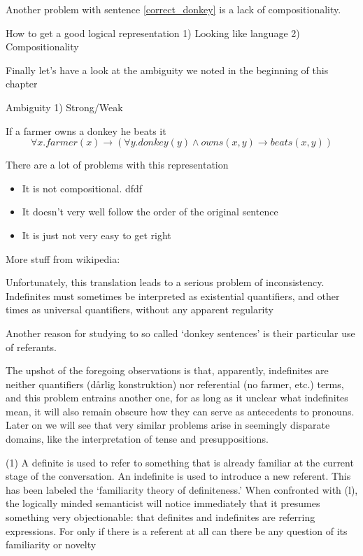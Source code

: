 \documentclass[12pt]{article}
\begin{document}
Another problem with sentence \eqref{correct_donkey} is a lack of compositionality.

How to get a good logical representation
  1) Looking like language
  2) Compositionality

Finally let's have a look at the ambiguity we noted in the beginning of this chapter

Ambiguity
  1) Strong/Weak






If a farmer owns a donkey he beats it
\begin{equation}
\forall x . farmer(x) \rightarrow (\forall y . donkey(y) \wedge owns(x,y) \rightarrow beats(x,y))
\end{equation}

There are a lot of problems with this representation
\begin{itemize}
  \item It is not compositional. 
  dfdf
  \item It doesn't very well follow the order of the original sentence
  \item It is just not very easy to get right
\end{itemize}

More stuff from wikipedia:

Unfortunately, this translation leads to a serious problem of inconsistency. Indefinites must sometimes be interpreted as existential quantifiers, and other times as universal quantifiers, without any apparent regularity




Another reason for studying to so called `donkey sentences' is their particular use of referants.



The upshot of the foregoing observations is that, apparently, indefinites are neither quantifiers (dårlig konstruktion) nor referential (no farmer, etc.) terms, and this problem entrains another one, for as long as it unclear what indefinites mean, it will also remain obscure how they can serve as antecedents to pronouns. Later on we will see that very similar problems arise in seemingly disparate domains, like the interpretation of tense and presuppositions.

(1)  A definite is used to refer to something that is already familiar at the current stage 
of the conversation. An indefinite is used to introduce a new referent. 
This has been  labeled the `familiarity  theory of definiteness.'
When confronted with (l), the logically minded semanticist will notice immediately 
that it  presumes  something  very  objectionable:  that  definites and indefinites  are 
referring expressions.  For  only  if  there  is  a referent at  all  can there be  any question 
of its familiarity or novelty
\end{document}
